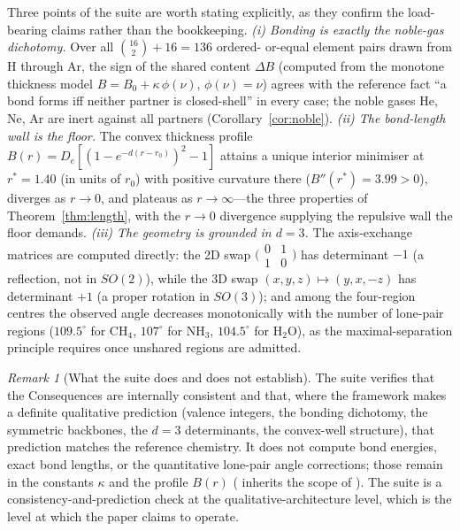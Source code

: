 \documentclass[11pt,twocolumn,a4paper]{article}
\theoremstyle{thmstyle}
\theoremstyle{definition}
\theoremstyle{remark}
\newtheorem{remark}[theorem]{Remark}
\newcommand{\thick}{B}                 %
\begin{document}
Three points of the suite are worth stating explicitly, as they confirm
the load-bearing claims rather than the bookkeeping. \emph{(i) Bonding is
exactly the noble-gas dichotomy.} Over all $\binom{16}{2}+16=136$ ordered-%
or-equal element pairs drawn from H through Ar, the sign of the shared
content $\Delta\thick$ (computed from the monotone thickness model
$\thick=\thick_0+\kappa\,\phi(\nu)$, $\phi(\nu)=\nu$) agrees with the
reference fact ``a bond forms iff neither partner is closed-shell'' in
every case; the noble gases He, Ne, Ar are inert against all partners
(Corollary~\ref{cor:noble}). \emph{(ii) The bond-length wall is the
floor.} The convex thickness profile $\thick(r)=D_e[(1-e^{-d(r-r_0)})^2-1]$
attains a unique interior minimiser at $r^{*}=1.40$ (in units of $r_0$)
with positive curvature there ($\thick''(r^{*})=3.99>0$), diverges as
$r\to0$, and plateaus as $r\to\infty$---the three properties of
Theorem~\ref{thm:length}, with the $r\to0$ divergence supplying the
repulsive wall the floor demands. \emph{(iii) The geometry is grounded in
$d=3$.} The axis-exchange matrices are computed directly: the 2D swap
$\bigl(\begin{smallmatrix}0&1\\1&0\end{smallmatrix}\bigr)$ has
determinant $-1$ (a reflection, not in $SO(2)$), while the 3D swap
$(x,y,z)\mapsto(y,x,-z)$ has determinant $+1$ (a proper rotation in
$SO(3)$); and among the four-region centres the observed angle decreases
monotonically with the number of lone-pair regions ($109.5^\circ$ for
CH$_4$, $107^\circ$ for NH$_3$, $104.5^\circ$ for H$_2$O), as the
maximal-separation principle requires once unshared regions are admitted.

\begin{remark}[What the suite does and does not establish]
\label{rem:validation-scope}
The suite verifies that the Consequences are internally consistent and
that, where the framework makes a definite qualitative prediction
(valence integers, the bonding dichotomy, the symmetric backbones, the
$d=3$ determinants, the convex-well structure), that prediction matches
the reference chemistry. It does not compute bond energies, exact bond
lengths, or the quantitative lone-pair angle corrections; those remain in
the constants $\kappa$ and the profile $\thick(r)$
( inherits the scope of ). The suite is
a consistency-and-prediction check at the qualitative-architecture level,
which is the level at which the paper claims to operate.
\end{remark}
\end{document}
